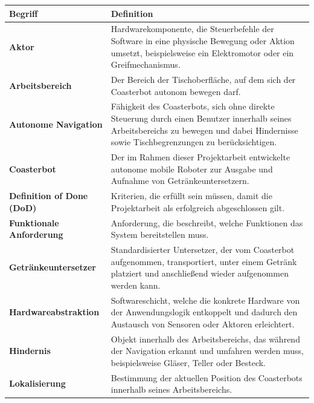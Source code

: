 \documentclass[
  a4paper,
  12pt,
  DIV=12,        %
  parskip=half,  %
  headings=small %
]{scrartcl}
\theoremstyle{definition}
\theoremstyle{definition}
\begin{document}
\begin{longtable}[]{@{}
  >{\raggedright\arraybackslash}p{}
  >{\raggedright\arraybackslash}p{}@{}}
\toprule\noalign{}
\begin{minipage}[b]{\linewidth}\raggedright
Begriff
\end{minipage} & \begin{minipage}[b]{\linewidth}\raggedright
Definition
\end{minipage} \\
\midrule\noalign{}
\endhead
\bottomrule\noalign{}
\endlastfoot
\textbf{Aktor} & Hardwarekomponente, die Steuerbefehle der Software in
eine physische Bewegung oder Aktion umsetzt, beispielsweise ein
Elektromotor oder ein Greifmechanismus. \\
\textbf{Arbeitsbereich} & Der Bereich der Tischoberfläche, auf dem sich
der Coasterbot autonom bewegen darf. \\
\textbf{Autonome Navigation} & Fähigkeit des Coasterbots, sich ohne
direkte Steuerung durch einen Benutzer innerhalb seines Arbeitsbereichs
zu bewegen und dabei Hindernisse sowie Tischbegrenzungen zu
berücksichtigen. \\
\textbf{Coasterbot} & Der im Rahmen dieser Projektarbeit entwickelte
autonome mobile Roboter zur Ausgabe und Aufnahme von
Getränkeuntersetzern. \\
\textbf{Definition of Done (DoD)} & Kriterien, die erfüllt sein müssen,
damit die Projektarbeit als erfolgreich abgeschlossen gilt. \\
\textbf{Funktionale Anforderung} & Anforderung, die beschreibt, welche
Funktionen das System bereitstellen muss. \\
\textbf{Getränkeuntersetzer} & Standardisierter Untersetzer, der vom
Coasterbot aufgenommen, transportiert, unter einem Getränk platziert und
anschließend wieder aufgenommen werden kann. \\
\textbf{Hardwareabstraktion} & Softwareschicht, welche die konkrete
Hardware von der Anwendungslogik entkoppelt und dadurch den Austausch
von Sensoren oder Aktoren erleichtert. \\
\textbf{Hindernis} & Objekt innerhalb des Arbeitsbereichs, das während
der Navigation erkannt und umfahren werden muss, beispielsweise Gläser,
Teller oder Besteck. \\
\textbf{Lokalisierung} & Bestimmung der aktuellen Position des
Coasterbots innerhalb seines Arbeitsbereichs. \\

\end{longtable}
\end{document}
